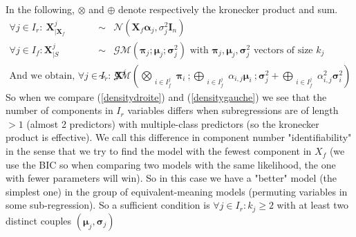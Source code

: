 \documentclass[11pt,a4paper]{article}
\begin{document}
	In the following, $\otimes$ and $\oplus$ denote respectively the kronecker product and sum.
	\begin{eqnarray}
			\forall j \in I_r : \  \boldsymbol{X}^j_{|\boldsymbol{X}_f}&\sim & \mathcal{N}(\boldsymbol{X}_f\boldsymbol{\alpha}_j,\sigma^2_j\boldsymbol{I}_n) \label{densitycondgauche}\\
			\forall j \in I_f : \boldsymbol{X}^j_{|S} &\sim& \mathcal{GM}(\boldsymbol{\pi}_j;\boldsymbol{\mu}_j;\boldsymbol{\sigma}^2_j) \textrm{ with } \boldsymbol{\pi}_j,\boldsymbol{\mu}_j,\boldsymbol{\sigma}^2_j \textrm{ vectors of size } k_j  \label{densitydroite}\\
			\textrm{And we obtain, } \forall j \in I_r : \  \boldsymbol{X}^j&\sim & 
						\mathcal{GM}(\bigotimes_{\substack{i \in I_f^j  }}\boldsymbol{\pi}_i \ ; 
			                         \bigoplus_{\substack{i \in I_f^j  }} \alpha_{i,j} \boldsymbol{\mu}_i \ ; 
			                         \boldsymbol{\sigma}_j^2+\bigoplus_{\substack{i \in I_f^j  }}\alpha_{i,j}^2 \boldsymbol{\sigma}_i^2 )\label{densitygauche}
		\end{eqnarray}
		So when we compare (\ref{densitydroite}) and (\ref{densitygauche}) we see that the number of components in $I_r$ variables differs when subregressions are of length $>1$ (almost 2 predictors) with multiple-class predictors (so the kronecker product is effective). We call this difference in component number "identifiability" in the sense that we try to find the model with the fewest component in $X_f$ (we use the BIC so when comparing two models with the same likelihood, the one with fewer parameters will win). So in this case we have a "better" model (the simplest one) in the group of equivalent-meaning models (permuting variables in some sub-regression).
	So a sufficient condition is $\forall j \in I_r: k_j\geq 2$ with at least two distinct couples $(\boldsymbol{\mu}_j,\boldsymbol{\sigma}_j)$
	
\end{document}

